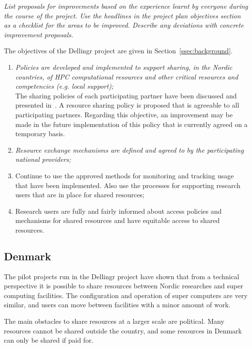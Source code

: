 \documentclass{article}
\newcommand{\dell}{Dellingr\xspace}
\begin{document}
{\it List proposals for improvements based on the experience learnt by everyone during the course of the project. Use the headlines in the project plan objectives section as a checklist for the areas to be improved. Describe any deviations with concrete improvement proposals.}


The objectives of the \dell project are given in Section~\ref{ssec:background}.

\begin{enumerate}
\item {\it Policies are developed and implemented to support sharing, in the Nordic countries, of HPC computational resources and other critical resources and competencies (e.g. local support);}\\
{
The sharing policies of each participating partner have been discussed and presented in~\cite{dellingr-p2-do5}.
A resource sharing policy is proposed that is agreeable to all participating partners.
Regarding this objective, an improvement may be made in the future implementation of this policy that is currently agreed on a temporary basis.
}

\item {\it Resource exchange mechanisms are defined and agreed to by the participating national providers;}
\item Continue to use the approved methods for monitoring and tracking usage that have been implemented. Also use the processes for supporting research users that are in place for shared resources;
\item Research users are fully and fairly informed about access policies and mechanisms for shared resources and have equitable 
access to shared resources.
\end{enumerate}

\subsection{Denmark}

The pilot projects run in the \dell project have shown that from a technical perspective it is possible to share resources between Nordic researches and super computing facilities. 
The configuration and operation of super computers are very similar, and users can move between facilities with a minor amount of work.

The main obstacles to share resources at a larger scale are political. Many resources cannot be shared outside the country, and some resources in Denmark can only be shared if paid for. 
\end{document}
